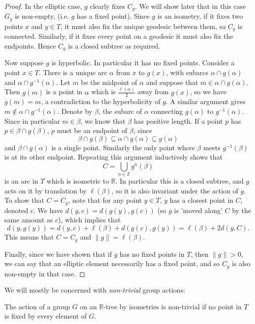 \begin{proof}
    In the elliptic case, $g$ clearly fixes $C_g$. We will show later that in this case $G_g$ is non-empty, (i.e. $g$ has a fixed point). Since $g$ is an isometry, if it fixes two points $x$ and $y\in T$, it must also fix the unique geodesic between them, so $C_g$ is connected. Similarly, if it fixes every point on a geodesic it must also fix the endpoints. Hence $C_g$ is a closed subtree as required.

    Now suppose $g$ is hyperbolic. In particular it has no fixed points. Consider a point $x\in T$. There is a unique arc $\alpha$ from $x$ to $g(x)$, with subarcs $\alpha \cap g(\alpha)$ and $\alpha \cap g^{-1}(\alpha)$. Let $m$ be the midpoint of $\alpha$ and suppose that $m\in \alpha \cap g(\alpha)$. Then $g(m)$ is a point in $\alpha$ which is $\frac{\ell(\alpha)}{2}$ away from $g(x)$, so we have $g(m)=m$, a contradiction to the hyperbolicity of $g$. A similar argument gives $m\notin \alpha \cap g^{-1}(\alpha)$. Denote by $\beta$, the subarc of $\alpha$ connecting $g(\alpha)$ to $g^{-1}(\alpha)$. Since in particular $m\in \beta$, we know that $\beta$ has positive length. If a point $p$ has $p\in \beta \cap g(\beta)$, $p$ must be an endpoint of $\beta$, since \[\beta\cap g(\beta)\subseteq\alpha\cap g(\alpha)\subseteq g(\alpha)\] and $\beta\cap g(\alpha)$ is a single point. Similarly the only point where $\beta$ meets $g^{-1}(\beta)$ is at its other endpoint. Repeating this argument inductively shows that \[C=\underset{n\in\mathbb{Z}}{\bigcup}g^n(\beta)\] is an arc in $T$ which is isometric to $\mathbb{R}$. In particular this is a closed subtree, and $g$ acts on it by translation by $\ell(\beta)$, so it is also invariant under the action of $g$. To show that $C=C_g$, note that for any point $y\in T$, $y$ has a closest point in $C$, denoted $c$. We have $d(y,c)=d(g(y),g(c))$ (so $g$ is 'moved along' $C$ by the same amount as $c$), which implies that \[d(y,g(y))=d(y,c)+\ell(\beta)+d(g(c),g(y))=\ell(\beta)+2d(y,C).\] This means that $C=C_g$ and $\lVert g\rVert=\ell(\beta)$.

    Finally, since we have shown that if $g$ has no fixed points in $T$, then $\lVert g\rVert>0$, we can say that an elliptic element necessarily has a fixed point, and so $C_g$ is also non-empty in that case.
\end{proof}

We will mostly be concerned with \textit{non-trivial} group actions:
\begin{definition}
    The action of a group $G$ on an $\mathbb{R}$-tree by isometries is \textnormal{non-trivial} if no point in $T$ is fixed by every element of $G$.
\end{definition}

